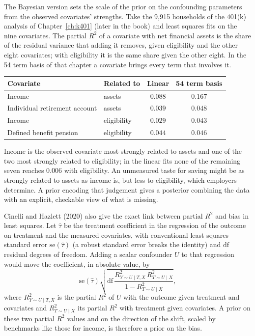 The Bayesian version sets the scale of the prior on the confounding parameters from the observed covariates' strengths. Take the 9,915 households of the 401(k) analysis of Chapter~\ref{ch:k401} (later in the book) and least squares fits on the nine covariates. The partial $R^2$ of a covariate with net financial assets is the share of the residual variance that adding it removes, given eligibility and the other eight covariates; with eligibility it is the same share given the other eight. In the 54 term basis of that chapter a covariate brings every term that involves it.
\begin{center}
\begin{tabular}{llcc}
\toprule
Covariate & Related to & Linear & 54 term basis \\
\midrule
Income & assets & $0.088$ & $0.167$ \\
Individual retirement account & assets & $0.039$ & $0.048$ \\
Income & eligibility & $0.029$ & $0.043$ \\
Defined benefit pension & eligibility & $0.044$ & $0.046$ \\
\bottomrule
\end{tabular}
\end{center}
Income is the observed covariate most strongly related to assets and one of the two most strongly related to eligibility; in the linear fits none of the remaining seven reaches 0.006 with eligibility. An unmeasured taste for saving might be as strongly related to assets as income is, but less to eligibility, which employers determine. A prior encoding that judgement gives a posterior combining the data with an explicit, checkable view of what is missing.

Cinelli and Hazlett (2020) also give the exact link between partial $R^2$ and bias in least squares. Let $\hat\tau$ be the treatment coefficient in the regression of the outcome on treatment and the measured covariates, with conventional least squares standard error $\mathrm{se}(\hat\tau)$ (a robust standard error breaks the identity) and $\mathrm{df}$ residual degrees of freedom. Adding a scalar confounder $U$ to that regression would move the coefficient, in absolute value, by
\[
\mathrm{se}(\hat\tau)\sqrt{\mathrm{df}\,\frac{R^2_{Y\sim U\mid T,X}\,R^2_{T\sim U\mid X}}{1 - R^2_{T\sim U\mid X}}},
\]
where $R^2_{Y\sim U\mid T,X}$ is the partial $R^2$ of $U$ with the outcome given treatment and covariates and $R^2_{T\sim U\mid X}$ its partial $R^2$ with treatment given covariates. A prior on these two partial $R^2$ values and on the direction of the shift, scaled by benchmarks like those for income, is therefore a prior on the bias.

